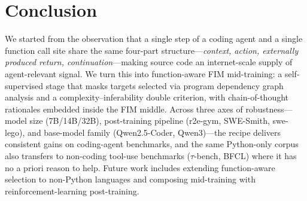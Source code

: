 \section{Conclusion}
\vspace{-0.5ex}
\label{sec:conclusion}

We started from the observation that a single step of a coding agent and
a single function call site share the same four-part structure---\textit{context,
action, externally produced return, continuation}---making source code an
internet-scale supply of agent-relevant signal. We turn this into
function-aware FIM mid-training: a self-supervised stage that masks
targets selected via program dependency graph analysis and a
complexity--inferability double criterion, with chain-of-thought
rationales embedded inside the FIM middle. Across three axes of
robustness---model size (7B/14B/32B), post-training pipeline (r2e-gym,
SWE-Smith, swe-lego), and base-model family (Qwen2.5-Coder, Qwen3)---the
recipe delivers consistent gains on coding-agent benchmarks, and the
same Python-only corpus also transfers to non-coding tool-use benchmarks
($\tau$-bench, BFCL) where it has no a priori reason to help. Future
work includes extending function-aware selection to non-Python languages
and composing mid-training with reinforcement-learning post-training.
